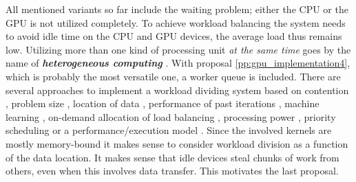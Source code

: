 \documentclass{article}
\theoremstyle{plain} %
\theoremstyle{convention} %
\theoremstyle{remark} %
\def\df#1{\textbf{\textit{#1}}}
\numberwithin{equation}{section}
\begin{document}
All mentioned variants so far include the waiting problem; either the CPU or the GPU is not utilized completely. To achieve workload balancing the system needs to avoid idle time on the CPU and GPU devices, the average load thus remains low. Utilizing more than one kind of processing unit \textit{at the same time} goes by the name of \df{heterogeneous computing} \cite{shan2006}. With proposal \ref{pp:gpu_implementation4}, which is probably the most versatile one, a worker queue is included. There are several approaches to implement a workload dividing system based on contention \cite{gregg2010}, problem size \cite{ding2009}, location of data \cite{becchi2010,augonnet2011}, performance of past iterations \cite{li2011,choi2013,bernabe2013,belviranli2013}, machine learning \cite{grewe2011}, on-demand allocation of load balancing \cite{agulleiro2012,teodoro2012}, processing power \cite{lu2012,hawick2013}, priority scheduling \cite{topcuoglu2002} or a performance/execution model \cite{augonnet2011,ogata2008}. Since the involved kernels are mostly memory-bound it makes sense to consider workload division as a function of the data location. It makes sense that idle devices steal chunks of work from others, even when this involves data transfer. This motivates the last proposal.
\end{document}
